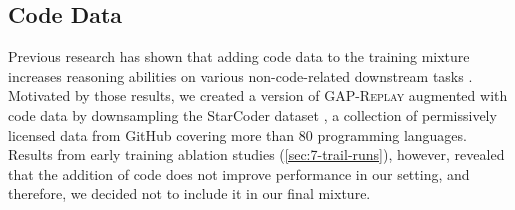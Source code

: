 \documentclass{article}
\begin{document}
\subsection{Code Data} 
\label{sec:appendix-data-code}
Previous research has shown that adding code data to the training mixture increases reasoning abilities on various non-code-related downstream tasks \citep{madaan-etal-2022-language, ma23training}. 
Motivated by those results, we created a version of \textsc{GAP-Replay} augmented with code data by downsampling the StarCoder dataset \citep{starcoder}, a collection of permissively licensed data from GitHub covering more than 80 programming languages. 
Results from early training ablation studies (\autoref{sec:7-trail-runs}), however, revealed that the addition of code does not improve performance in our setting, and therefore, we decided not to include it in our final mixture.
\end{document}
